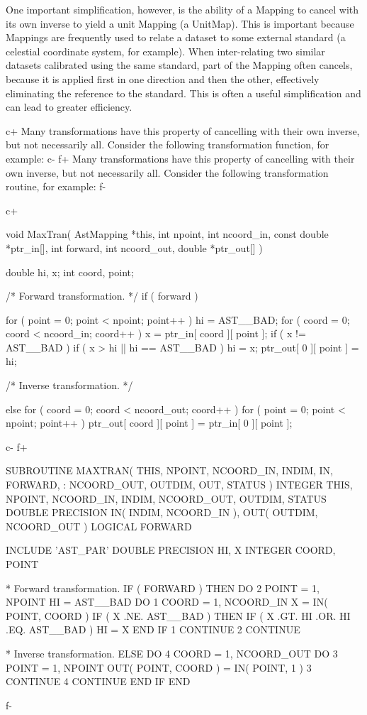 \documentclass[twoside,11pt]{starlink}
\begin{document}
One important simplification, however, is the ability of a Mapping to
cancel with its own inverse to yield a unit Mapping (a UnitMap). This
is important because Mappings are frequently used to relate a dataset
to some external standard (a celestial coordinate system, for
example). When inter-relating two similar datasets calibrated using
the same standard, part of the Mapping often cancels, because it is
applied first in one direction and then the other, effectively
eliminating the reference to the standard. This is often a useful
simplification and can lead to greater efficiency.

c+
Many transformations have this property of cancelling with their own
inverse, but not necessarily all. Consider the following
transformation function, for example:
c-
f+
Many transformations have this property of cancelling with their own
inverse, but not necessarily all. Consider the following
transformation routine, for example:
f-

c+
\small
\begin{terminalv}
void MaxTran( AstMapping *this, int npoint, int ncoord_in,
              const double *ptr_in[], int forward, int ncoord_out,
              double *ptr_out[] ) {
   double hi, x;
   int coord, point;

/* Forward transformation. */
   if ( forward ) {
      for ( point = 0; point < npoint; point++ ) {
         hi = AST__BAD;
         for ( coord = 0; coord < ncoord_in; coord++ ) {
            x = ptr_in[ coord ][ point ];
            if ( x != AST__BAD ) {
               if ( x > hi || hi == AST__BAD ) hi = x;
            }
         }
         ptr_out[ 0 ][ point ] = hi;
      }

/* Inverse transformation. */
   } else {
      for ( coord = 0; coord < ncoord_out; coord++ ) {
         for ( point = 0; point < npoint; point++ ) {
            ptr_out[ coord ][ point ] = ptr_in[ 0 ][ point ];
         }
      }
   }
}
\end{terminalv}
\normalsize
c-
f+
\small
\begin{terminalv}
      SUBROUTINE MAXTRAN( THIS, NPOINT, NCOORD_IN, INDIM, IN, FORWARD,
     :                    NCOORD_OUT, OUTDIM, OUT, STATUS )
      INTEGER THIS, NPOINT, NCOORD_IN, INDIM, NCOORD_OUT, OUTDIM, STATUS
      DOUBLE PRECISION IN( INDIM, NCOORD_IN ), OUT( OUTDIM, NCOORD_OUT )
      LOGICAL FORWARD

      INCLUDE 'AST_PAR'
      DOUBLE PRECISION HI, X
      INTEGER COORD, POINT

*  Forward transformation.
      IF ( FORWARD ) THEN
         DO 2 POINT = 1, NPOINT
            HI = AST__BAD
            DO 1 COORD = 1, NCOORD_IN
               X = IN( POINT, COORD )
               IF ( X .NE. AST__BAD ) THEN
                  IF ( X .GT. HI .OR. HI .EQ. AST__BAD ) HI = X
               END IF
 1          CONTINUE
 2       CONTINUE

*  Inverse transformation.
      ELSE
         DO 4 COORD = 1, NCOORD_OUT
            DO 3 POINT = 1, NPOINT
               OUT( POINT, COORD ) = IN( POINT, 1 )
 3          CONTINUE
 4       CONTINUE
      END IF
      END
\end{terminalv}
\normalsize
f-
\end{document}
